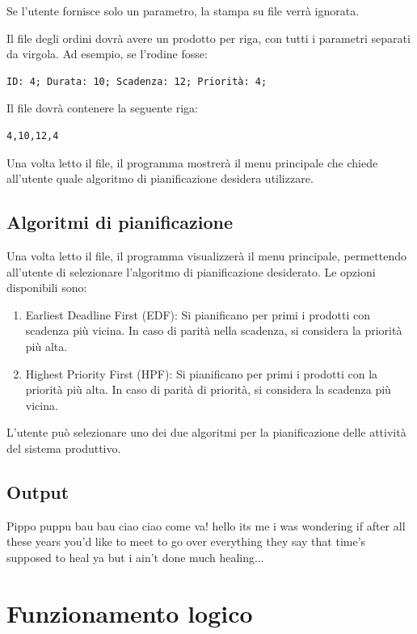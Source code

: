 \documentclass[a4paper]{report}
\begin{document}
Se l'utente fornisce solo un parametro, la stampa su file verrà ignorata.

Il file degli ordini dovrà avere un prodotto per riga, con tutti i parametri separati da virgola. Ad esempio, se l'rodine fosse:
\begin{verbatim}
ID: 4; Durata: 10; Scadenza: 12; Priorità: 4;
\end{verbatim}
Il file dovrà contenere la seguente riga:
\begin{verbatim}
4,10,12,4
\end{verbatim}

Una volta letto il file, il programma mostrerà il menu principale che chiede all'utente quale algoritmo di pianificazione desidera utilizzare.



\subsection{Algoritmi di pianificazione}
Una volta letto il file, il programma visualizzerà il menu principale, permettendo all'utente di selezionare l'algoritmo di pianificazione desiderato. Le opzioni disponibili sono:

\begin{enumerate}
    \item Earliest Deadline First (EDF): Si pianificano per primi i prodotti con scadenza più vicina. In caso di parità nella scadenza, si considera la priorità più alta.
    \item Highest Priority First (HPF): Si pianificano per primi i prodotti con la priorità più alta. In caso di parità di priorità, si considera la scadenza più vicina.
\end{enumerate}

L'utente può selezionare uno dei due algoritmi per la pianificazione delle attività del sistema produttivo.

\subsection{Output}

Pippo puppu bau bau ciao ciao come va! hello its me i was wondering if after all these years you'd like to meet to go over everything they say that time's supposed to heal ya but i ain't done much healing...
\section{Funzionamento logico}
\end{document}
